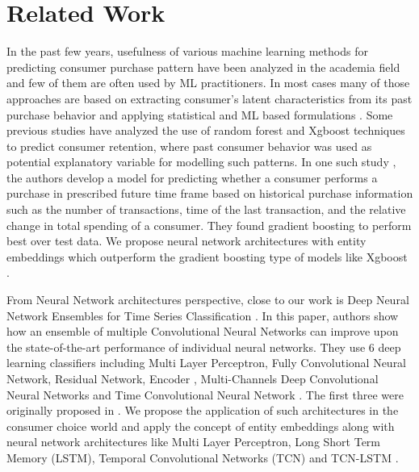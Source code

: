 \section{Related Work}
\label{sec:relatedwork}
In the past few years, usefulness of various machine learning methods for predicting consumer purchase pattern have been 
analyzed in the academia field and few of them are often used by ML practitioners. In most cases many of those approaches are 
based on extracting consumer's latent characteristics from its past purchase behavior and applying statistical and  
ML based formulations \cite{fader2009probability, choudhury2019machine}. 
Some previous studies have analyzed the use of random forest and Xgboost techniques to predict 
consumer retention, where past consumer behavior was used as potential explanatory variable 
for modelling such patterns. In one such study \cite{martinez2020machine}, the authors develop a model for predicting whether a 
consumer performs a purchase in prescribed future time frame based on historical purchase information such as the number
of transactions, time of the last transaction, and the relative change in total spending of a consumer. 
They found gradient boosting to perform best over test data. We propose neural network architectures with entity embeddings
\cite{guo2016entity} which outperform the gradient boosting type of models like Xgboost \cite{chen2016xgboost}. 

From Neural Network architectures perspective,
close to our work is Deep Neural Network Ensembles for Time Series Classification \cite{fawaz2019deep}. 
In this paper, authors show how an ensemble of multiple Convolutional Neural Networks can improve upon the 
state-of-the-art performance of individual neural networks. They use 6 deep learning classifiers 
including Multi Layer Perceptron, Fully Convolutional Neural Network, Residual Network, 
Encoder \cite{serra2018towards}, Multi-Channels Deep Convolutional Neural Networks \cite{zheng2014time} and 
Time Convolutional Neural Network \cite{zhao2017convolutional}. The first three were originally proposed in \cite{wang2017time}.
We propose the application of such architectures in the consumer choice world and apply the concept of entity embeddings 
\cite{guo2016entity} along with neural network architectures
like Multi Layer Perceptron, Long Short Term Memory (LSTM), Temporal Convolutional Networks (TCN) \cite{lea2016temporal} and 
TCN-LSTM \cite{karim2017lstm}.
